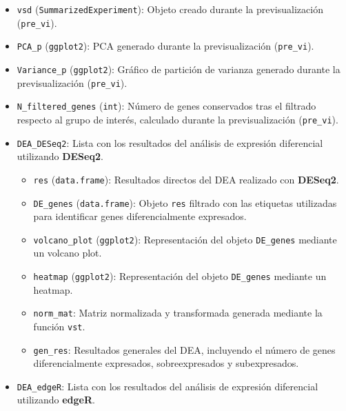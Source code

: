 \documentclass[
  10pt,
]{article}
\begin{document}
\begin{itemize}
\item
  \texttt{vsd} (\texttt{SummarizedExperiment}): Objeto creado durante la
  previsualización (\texttt{pre\_vi}).
\item
  \texttt{PCA\_p} (\texttt{ggplot2}): PCA generado durante la
  previsualización (\texttt{pre\_vi}).
\item
  \texttt{Variance\_p} (\texttt{ggplot2}): Gráfico de partición de
  varianza generado durante la previsualización (\texttt{pre\_vi}).
\item
  \texttt{N\_filtered\_genes} (\texttt{int}): Número de genes
  conservados tras el filtrado respecto al grupo de interés, calculado
  durante la previsualización (\texttt{pre\_vi}).
\item
  \texttt{DEA\_DESeq2}: Lista con los resultados del análisis de
  expresión diferencial utilizando \textbf{DESeq2}.

  \begin{itemize}
  \item
    \texttt{res} (\texttt{data.frame}): Resultados directos del DEA
    realizado con \textbf{DESeq2}.
  \item
    \texttt{DE\_genes} (\texttt{data.frame}): Objeto \texttt{res}
    filtrado con las etiquetas utilizadas para identificar genes
    diferencialmente expresados.
  \item
    \texttt{volcano\_plot} (\texttt{ggplot2}): Representación del objeto
    \texttt{DE\_genes} mediante un volcano plot.
  \item
    \texttt{heatmap} (\texttt{ggplot2}): Representación del objeto
    \texttt{DE\_genes} mediante un heatmap.
  \item
    \texttt{norm\_mat}: Matriz normalizada y transformada generada
    mediante la función \texttt{vst}.
  \item
    \texttt{gen\_res}: Resultados generales del DEA, incluyendo el
    número de genes diferencialmente expresados, sobreexpresados y
    subexpresados.
  \end{itemize}
\item
  \texttt{DEA\_edgeR}: Lista con los resultados del análisis de
  expresión diferencial utilizando \textbf{edgeR}.


\end{itemize}
\end{document}
